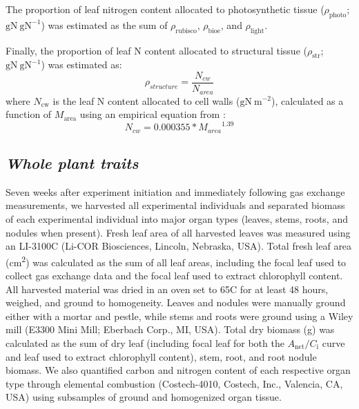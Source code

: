 The proportion of leaf nitrogen content allocated to photosynthetic tissue ($\rho_\mathrm{{photo}}$; $\mathrm{gN\ gN^{-1}}$) was estimated as the sum of $\rho_\mathrm{{rubisco}}$, $\rho_\mathrm{{bioe}}$, and $\rho_\mathrm{{light}}$.

Finally, the proportion of leaf N content allocated to structural tissue ($\rho_\mathrm{{str}}$; $\mathrm{gN\ gN^{-1}}$) was estimated as:
\begin{equation} \label{eqn_5.9}
    \rho_{structure}=\frac{N_{cw}}{N_{area}}
\end{equation}
\noindent where $N_\mathrm{cw}$ is the leaf N content allocated to cell walls ($\mathrm{gN\ m^{-2}}$), calculated as a function of $M_\mathrm{area}$ using an empirical equation from :
\begin{equation} \label{eqn_5.10}
    N_{cw}=0.000355*{M_{area}}^{1.39}
\end{equation}

\subsection{\textit{Whole plant traits}}
Seven weeks after experiment initiation and immediately following gas exchange measurements, we harvested all experimental individuals and separated biomass of each experimental individual into major organ types (leaves, stems, roots, and nodules when present). Fresh leaf area of all harvested leaves was measured using an LI-3100C (Li-COR Biosciences, Lincoln, Nebraska, USA). Total fresh leaf area (cm\textsuperscript{2}) was calculated as the sum of all leaf areas, including the focal leaf used to collect gas exchange data and the focal leaf used to extract chlorophyll content. All harvested material was dried in an oven set to 65\textdegree{}C for at least 48 hours, weighed, and ground to homogeneity. Leaves and nodules were manually ground either with a mortar and pestle, while stems and roots were ground using a Wiley mill (E3300 Mini Mill; Eberbach Corp., MI, USA). Total dry biomass (g) was calculated as the sum of dry leaf (including focal leaf for both the $A_\mathrm{{net}}/C_\mathrm{i}$ curve and leaf used to extract chlorophyll content), stem, root, and root nodule biomass. We also quantified carbon and nitrogen content of each respective organ type through elemental combustion (Costech-4010, Costech, Inc., Valencia, CA, USA) using subsamples of ground and homogenized organ tissue.

